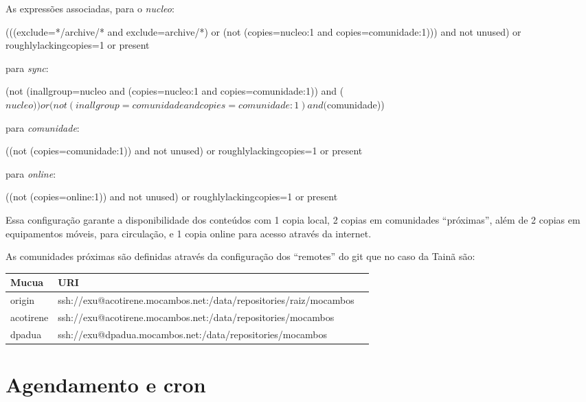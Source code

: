 As expressões associadas, para o \emph{nucleo}:\\
\begin{code}
(((exclude=*/archive/* and exclude=archive/*) or (not
(copies=nucleo:1 and copies=comunidade:1))) and not unused) or
roughlylackingcopies=1 or present
\end{code}

para \emph{sync}:\\
\begin{code}
(not (inallgroup=nucleo and (copies=nucleo:1 and copies=comunidade:1)) 
and ($nucleo)) or (not (inallgroup=comunidade and copies=comunidade:1)
and ($comunidade))
\end{code}

para \emph{comunidade}:\\
\begin{code}
((not (copies=comunidade:1)) and not unused) or
roughlylackingcopies=1 or present
\end{code}

para \emph{online}:\\
\begin{code}
((not (copies=online:1)) and not unused) or
roughlylackingcopies=1 or present
\end{code}


Essa configuração garante a disponibilidade dos conteúdos com 1 copia
local, 2 copias em comunidades ``próximas'', além de 2 copias em
equipamentos móveis, para circulação, e 1 copia online para acesso
através da internet.

As comunidades próximas são definidas através da configuração
dos ``remotes'' do git que no caso da Tainã são:
\begin{table}[h]
  \centering
  \begin{tabularx}{\textwidth}{ X | l  X  }
    \textbf{Mucua} & \textbf{URI} \\ [0.5ex]
    \hline
    origin & ssh://exu@acotirene.mocambos.net:/data/repositories/raiz/mocambos \\
    acotirene & ssh://exu@acotirene.mocambos.net:/data/repositories/mocambos \\
    dpadua & ssh://exu@dpadua.mocambos.net:/data/repositories/mocambos \\
    \hline  
  \end{tabularx}
\end{table}


\section{Agendamento e cron}

